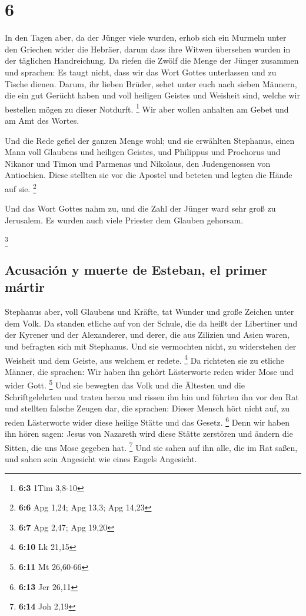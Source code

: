 \hypertarget{section-5}{%
\section{6}\label{section-5}}

 In den Tagen aber, da der Jünger viele wurden, erhob sich
ein Murmeln unter den Griechen wider die Hebräer, darum dass ihre Witwen
übersehen wurden in der täglichen Handreichung.  Da riefen
die Zwölf die Menge der Jünger zusammen und sprachen: Es taugt nicht,
dass wir das Wort Gottes unterlassen und zu Tische dienen.
 Darum, ihr lieben Brüder, sehet unter euch nach sieben
Männern, die ein gut Gerücht haben und voll heiligen Geistes und
Weisheit sind, welche wir bestellen mögen zu dieser Notdurft.
\footnote{\textbf{6:3} 1Tim 3,8-10}  Wir aber wollen
anhalten am Gebet und am Amt des Wortes.

 Und die Rede gefiel der ganzen Menge wohl; und sie
erwählten Stephanus, einen Mann voll Glaubens und heiligen Geistes, und
Philippus und Prochorus und Nikanor und Timon und Parmenas und Nikolaus,
den Judengenossen von Antiochien.  Diese stellten sie vor
die Apostel und beteten und legten die Hände auf sie. \footnote{\textbf{6:6}
  Apg 1,24; Apg 13,3; Apg 14,23}

 Und das Wort Gottes nahm zu, und die Zahl der Jünger ward
sehr groß zu Jerusalem. Es wurden auch viele Priester dem Glauben
gehorsam.

\footnote{\textbf{6:7} Apg 2,47; Apg 19,20}

\hypertarget{acusaciuxf3n-y-muerte-de-esteban-el-primer-muxe1rtir}{%
\subsection{Acusación y muerte de Esteban, el primer
mártir}\label{acusaciuxf3n-y-muerte-de-esteban-el-primer-muxe1rtir}}

 Stephanus aber, voll Glaubens und Kräfte, tat Wunder und
große Zeichen unter dem Volk.  Da standen etliche auf von
der Schule, die da heißt der Libertiner und der Kyrener und der
Alexanderer, und derer, die aus Zilizien und Asien waren, und befragten
sich mit Stephanus.  Und sie vermochten nicht, zu
widerstehen der Weisheit und dem Geiste, aus welchem er redete.
\footnote{\textbf{6:10} Lk 21,15}  Da richteten sie zu
etliche Männer, die sprachen: Wir haben ihn gehört Lästerworte reden
wider Mose und wider Gott. \footnote{\textbf{6:11} Mt 26,60-66}
 Und sie bewegten das Volk und die Ältesten und die
Schriftgelehrten und traten herzu und rissen ihn hin und führten ihn vor
den Rat  und stellten falsche Zeugen dar, die sprachen:
Dieser Mensch hört nicht auf, zu reden Lästerworte wider diese heilige
Stätte und das Gesetz. \footnote{\textbf{6:13} Jer 26,11}
 Denn wir haben ihn hören sagen: Jesus von Nazareth wird
diese Stätte zerstören und ändern die Sitten, die uns Mose gegeben hat.
\footnote{\textbf{6:14} Joh 2,19}  Und sie sahen auf ihn
alle, die im Rat saßen, und sahen sein Angesicht wie eines Engels
Angesicht.

